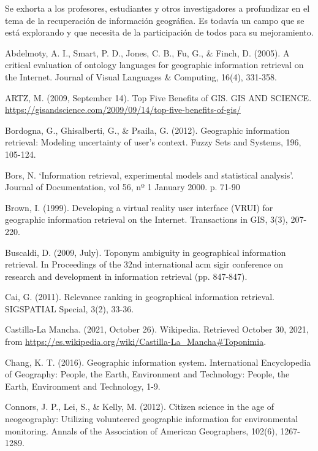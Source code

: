 \documentclass{llncs}
\begin{document}
Se exhorta a los profesores, estudiantes y otros investigadores a profundizar
en el tema de la recuperación de información geográfica. Es todavía un
campo que se está explorando y que necesita de la participación de todos
para su mejoramiento.

\newpage

%
%
\begin{thebibliography}{}
%

Abdelmoty, A. I., Smart, P. D., Jones, C. B., Fu, G., \& Finch, D. (2005). A
critical evaluation of ontology languages for geographic information retrieval
on the Internet. Journal of Visual Languages \& Computing, 16(4), 331-358.

ARTZ, M. (2009, September 14). Top Five Benefits of GIS. GIS AND SCIENCE.
\url{https://gisandscience.com/2009/09/14/top-five-benefits-of-gis/}

Bordogna, G., Ghisalberti, G., \& Psaila, G. (2012). Geographic
information retrieval: Modeling uncertainty of user's context. Fuzzy Sets and
Systems, 196, 105-124.

Bors, N. ‘Information retrieval, experimental models and
statistical analysis’. Journal of Documentation, vol 56, nº 1 January 2000. p.
71-90

Brown, I. (1999). Developing a virtual reality user interface (VRUI) for
geographic information retrieval on the Internet. Transactions in GIS, 3(3),
207-220.

Buscaldi, D. (2009, July). Toponym ambiguity in geographical information
retrieval. In Proceedings of the 32nd international acm sigir conference on
research and development in information retrieval (pp. 847-847).

Cai, G. (2011). Relevance ranking in geographical information retrieval.
SIGSPATIAL Special, 3(2), 33-36.

Castilla-La Mancha. (2021, October 26). Wikipedia. Retrieved October 30, 2021,
from \url{https://es.wikipedia.org/wiki/Castilla-La_Mancha#Toponimia}.

Chang, K. T. (2016). Geographic information system. International Encyclopedia
of Geography: People, the Earth, Environment and Technology: People, the Earth,
Environment and Technology, 1-9.

Connors, J. P., Lei, S., \& Kelly, M. (2012). Citizen science in the age of
neogeography: Utilizing volunteered geographic information for environmental
monitoring. Annals of the Association of American Geographers, 102(6),
1267-1289.


\end{thebibliography}
\end{document}
